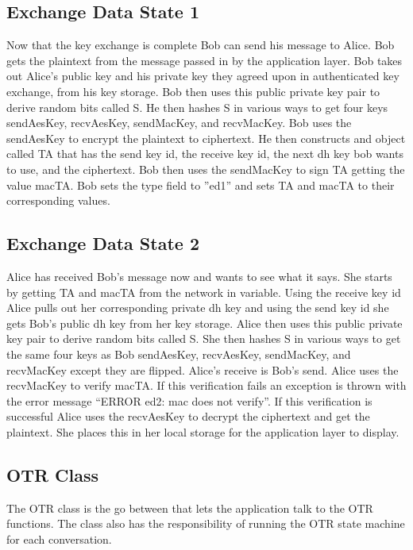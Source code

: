 \subsection{Exchange Data State 1}


Now that the key exchange is complete Bob can send his message to Alice. Bob gets the plaintext from the message passed in by the application layer. Bob takes out Alice’s public key and his private key they agreed upon in authenticated key exchange, from his key storage. Bob then uses this public private key pair to derive random bits called S. He then hashes S in various ways to get four keys sendAesKey, recvAesKey, sendMacKey, and recvMacKey. Bob uses the sendAesKey to encrypt the plaintext to ciphertext. He then constructs and object called TA that has the send key id, the receive key id, the next dh key bob wants to use, and the ciphertext. Bob then uses the sendMacKey to sign TA getting the value macTA. Bob sets the type field to ”ed1” and sets TA and macTA to their corresponding values.
 
\subsection{Exchange Data State 2}


Alice has received Bob’s message now and wants to see what it says. She starts by getting TA and macTA from the network in variable. Using the receive key id Alice pulls out her corresponding private dh key and using the send key id she gets Bob’s public dh key from her key storage. Alice then uses this public private key pair to derive random bits called S. She then hashes S in various ways to get the same four keys as Bob sendAesKey, recvAesKey, sendMacKey, and recvMacKey except they are flipped. Alice’s receive is Bob’s send. Alice uses the recvMacKey to verify macTA. If this verification fails an exception is thrown with the error message “ERROR ed2: mac does not verify”. If this verification is successful Alice uses the recvAesKey to decrypt the ciphertext and get the plaintext. She places this in her local storage for the application layer to display.


\subsection{OTR Class}


The OTR class is the go between that lets the application talk to the OTR functions. The class also has the responsibility of running the OTR state machine for each conversation. 


